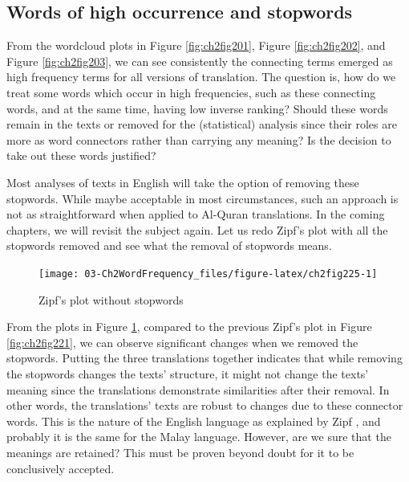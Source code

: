 \documentclass[
]{article}
\begin{document}
\hypertarget{words-of-high-occurrence-and-stopwords}{%
\subsection{Words of high occurrence and stopwords}\label{words-of-high-occurrence-and-stopwords}}

From the wordcloud plots in Figure \ref{fig:ch2fig201}, Figure \ref{fig:ch2fig202}, and Figure \ref{fig:ch2fig203}, we can see consistently the connecting terms emerged as high frequency terms for all versions of translation. The question is, how do we treat some words which occur in high frequencies, such as these connecting words, and at the same time, having low inverse ranking? Should these words remain in the texts or removed for the (statistical) analysis since their roles are more as word connectors rather than carrying any meaning? Is the decision to take out these words justified?

Most analyses of texts in English will take the option of removing these stopwords. While maybe acceptable in most circumstances, such an approach is not as straightforward when applied to Al-Quran translations. In the coming chapters, we will revisit the subject again. Let us redo Zipf's plot with all the stopwords removed and see what the removal of stopwords means.

\begin{figure}

{\centering \texttt{[image: 03-Ch2WordFrequency\_files/figure-latex/ch2fig225-1]} 

}

\caption{Zipf's plot without stopwords}\label{fig:ch2fig225}
\end{figure}

From the plots in Figure \ref{fig:ch2fig225}, compared to the previous Zipf's plot in Figure \ref{fig:ch2fig221}, we can observe significant changes when we removed the stopwords. Putting the three translations together indicates that while removing the stopwords changes the texts' structure, it might not change the texts' meaning since the translations demonstrate similarities after their removal. In other words, the translations' texts are robust to changes due to these connector words. This is the nature of the English language as explained by Zipf \citep{zipf1949}, and probably it is the same for the Malay language. However, are we sure that the meanings are retained? This must be proven beyond doubt for it to be conclusively accepted.
\end{document}

